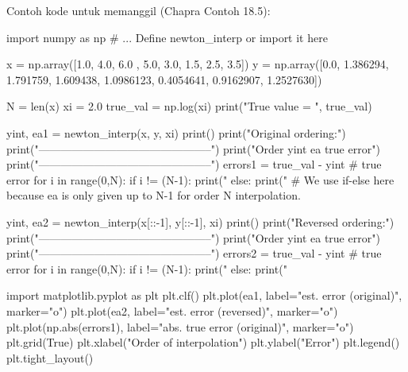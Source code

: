 Contoh kode untuk memanggil  (Chapra Contoh 18.5):
\begin{pythoncode}
import numpy as np
# ... Define newton_interp or import it here

x = np.array([1.0, 4.0, 6.0 , 5.0, 3.0, 1.5, 2.5, 3.5])
y = np.array([0.0, 1.386294, 1.791759, 1.609438, 1.0986123, 0.4054641, 0.9162907, 1.2527630])
    
N = len(x)
xi = 2.0
true_val = np.log(xi)
print("True value = ", true_val)

yint, ea1 = newton_interp(x, y, xi)
print()
print("Original ordering:")
print("-----------------------------------------------")
print("Order        yint          ea        true error")
print("-----------------------------------------------")
errors1 = true_val - yint # true error
for i in range(0,N):
    if i != (N-1):
        print("%
    else:
        print("%
# We use if-else here because ea is only given up to N-1 for order N interpolation.


yint, ea2 = newton_interp(x[::-1], y[::-1], xi)
print()
print("Reversed ordering:")
print("-----------------------------------------------")
print("Order        yint          ea        true error")
print("-----------------------------------------------")
errors2 = true_val - yint # true error
for i in range(0,N):
    if i != (N-1):
        print("%
    else:
        print("%

import matplotlib.pyplot as plt
plt.clf()
plt.plot(ea1, label="est. error (original)", marker="o")
plt.plot(ea2, label="est. error (reversed)", marker="o")
plt.plot(np.abs(errors1), label="abs. true error (original)", marker="o")
plt.grid(True)
plt.xlabel("Order of interpolation")
plt.ylabel("Error")
plt.legend()
plt.tight_layout()
\end{pythoncode}

